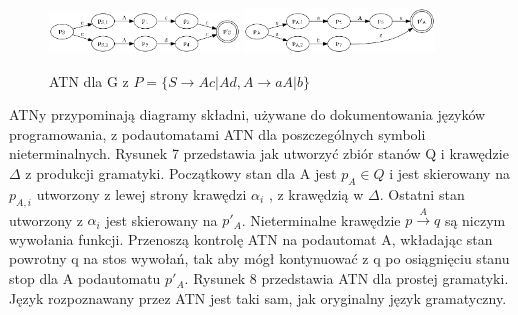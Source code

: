 \begin{figure}[h]
\includegraphics[width=0.45\textwidth]{Figure8a.png}
\includegraphics[width=0.45\textwidth]{Figure8b.png}
\caption{ATN dla G z \( P = \{S \rightarrow Ac|Ad, A \rightarrow aA|b \} \)}
\end{figure}

ATNy przypominają diagramy składni, używane do dokumentowania języków programowania,
z podautomatami ATN dla poszczególnych symboli nieterminalnych.
Rysunek 7 przedstawia jak utworzyć zbiór stanów Q i krawędzie \( \Delta \)
z produkcji gramatyki. Początkowy stan dla A jest \( p_A \in Q \)
i jest skierowany na \( p_{A,i} \) utworzony z lewej strony krawędzi \( \alpha_i \) ,
z krawędzią w \( \Delta \). Ostatni stan utworzony z \( \alpha_i \) jest skierowany na \( p'_A \).
Nieterminalne krawędzie \( p \overset{A}{\rightarrow} q\) są niczym wywołania funkcji.
Przenoszą kontrolę ATN na podautomat A, wkładając stan powrotny q na stos wywołań,
tak aby mógł kontynuować z q po osiągnięciu stanu stop dla A podautomatu \( p'_A \).
Rysunek 8 przedstawia ATN dla prostej gramatyki.
Język rozpoznawany przez ATN jest taki sam, jak oryginalny język gramatyczny.
